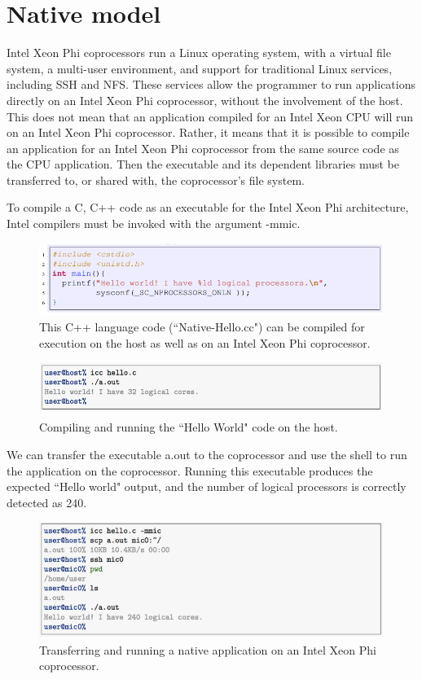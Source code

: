 \documentclass[12pt]{article}
\begin{document}
\section{Native model}
Intel Xeon Phi coprocessors run a Linux operating system, with a virtual file system, a multi-user environment, and support for traditional Linux services, including SSH and NFS. These services allow the programmer to run applications directly on an Intel Xeon Phi coprocessor, without the involvement of the host. This does not mean that an application compiled for an Intel Xeon CPU will run on an Intel Xeon Phi coprocessor. Rather, it means that it is possible to compile an application for an Intel Xeon Phi coprocessor from the same source code as the CPU application. Then the executable and its dependent libraries must be transferred to, or shared with, the coprocessor's file system.

To compile a C, C++ code as an executable for the Intel Xeon Phi architecture, Intel compilers must be invoked with the argument -mmic.
\begin{figure}[H]
\centering
\includegraphics[scale = 0.9]{chainer4.png}
\caption{This C++ language code (``Native-Hello.cc") can be compiled for execution on the host as well as on an Intel Xeon Phi coprocessor.}
\end{figure}
\begin{figure}[H]
\centering
\includegraphics[scale = 0.9]{chainer5.png}
\caption{Compiling and running the ``Hello World" code on the host.}
\end{figure}

We can transfer the executable a.out to the coprocessor and use the shell to run the application on the coprocessor. Running this executable produces the expected ``Hello world" output, and the number of logical processors is correctly detected as 240.

\begin{figure}[H]
\centering
\includegraphics[scale = 0.9]{chainer6.png}
\caption{Transferring and running a native application on an Intel Xeon Phi coprocessor.}
\end{figure}
\newpage
\end{document}
